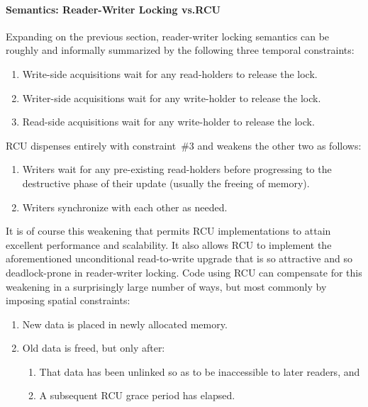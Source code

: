 \paragraph{Semantics:
		      Reader-Writer Locking vs.\@ RCU}

Expanding on the previous section, reader-writer locking semantics can
be roughly and informally summarized by the following three temporal
constraints:

\begin{enumerate}
\item	Write-side acquisitions wait for any read-holders to release
	the lock.
\item	Writer-side acquisitions wait for any write-holder to release
	the lock.
\item	Read-side acquisitions wait for any write-holder to release
	the lock.
\end{enumerate}

RCU dispenses entirely with constraint~\#3 and weakens the other two
as follows:

\begin{enumerate}
\item	Writers wait for any pre-existing read-holders before progressing
	to the destructive phase of their update (usually the freeing of
	memory).
\item	Writers synchronize with each other as needed.
\end{enumerate}

It is of course this weakening that permits RCU implementations to attain
excellent performance and scalability.
It also allows RCU to implement the aforementioned unconditional
read-to-write upgrade that is so attractive and so deadlock-prone in
reader-writer locking.
Code using RCU can compensate for this weakening in a surprisingly large
number of ways, but most commonly by imposing spatial constraints:

\begin{enumerate}
\item	New data is placed in newly allocated memory.
\item	Old data is freed, but only after:
	\begin{enumerate}
	\item	That data has been unlinked so as to be inaccessible
		to later readers, and
	\item	A subsequent RCU grace period has elapsed.
	\end{enumerate}
\end{enumerate}

